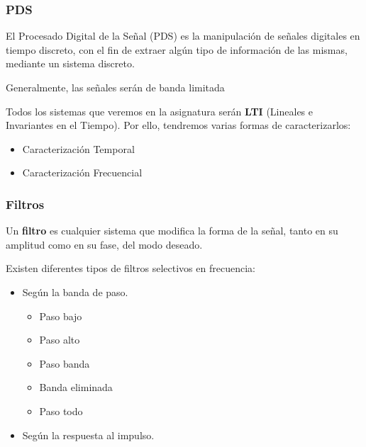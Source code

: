 \documentclass[a4paper]{book}
\begin{document}
\subsubsection{PDS}

El Procesado Digital de la Señal (PDS) es la manipulación de señales digitales en tiempo discreto, con el fin de extraer algún tipo de información de las mismas, mediante un sistema discreto.

Generalmente, las señales serán de banda limitada

Todos los sistemas que veremos en la asignatura serán \textbf{LTI} (Lineales e Invariantes en el Tiempo). Por ello, tendremos varias formas de caracterizarlos:
\begin{itemize}
	\item Caracterización Temporal
	\item Caracterización Frecuencial
\end{itemize}

\subsubsection{Filtros}

Un \textbf{filtro} es cualquier sistema que modifica la forma de la señal, tanto en su amplitud como en su fase, del modo deseado.

Existen diferentes tipos de filtros selectivos en frecuencia:
\begin{itemize}
	\item Según la banda de paso.
	      \begin{itemize}
		      \item Paso bajo
		      \item Paso alto
		      \item Paso banda
		      \item Banda eliminada
		      \item Paso todo
	      \end{itemize}
	\item Según la respuesta al impulso.
\end{itemize}
\end{document}
